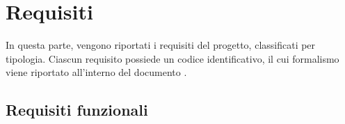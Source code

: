 \section{Requisiti}


\newcommand{\req}[3]{\textbf{R#1-#2-#3}}
\newcommand{\sreq}[3]{{\color{gray} R#1-#2-}#3}
\newcommand{\autism}{ \\ \hline}


In questa parte, vengono riportati i requisiti del progetto, classificati per tipologia. Ciascun requisito possiede un codice identificativo, il cui formalismo viene riportato all'interno del documento .




	\subsection{Requisiti funzionali}

